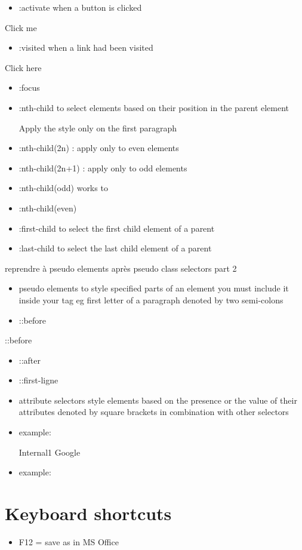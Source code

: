 \documentclass[
]{book}
\providecommand{\tightlist}{%
  \setlength{\itemsep}{0pt}\setlength{\parskip}{0pt}}
\begin{document}
\begin{itemize}
\tightlist
\item
  :activate
  when a button is clicked
\end{itemize}

Click me

\begin{itemize}
\tightlist
\item
  :visited
  when a link had been visited
\end{itemize}

Click here

\begin{itemize}
\tightlist
\item
  :focus
\end{itemize}

\begin{itemize}
\item
  :nth-child
  to select elements based on their position in the parent element

  Apply the style only on the first paragraph
\item
  :nth-child(2n) : apply only to even elements
\item
  :nth-child(2n+1) : apply only to odd elements
\item
  :nth-child(odd) works to
\item
  :nth-child(even)
\item
  :first-child
  to select the first child element of a parent
\item
  :last-child
  to select the last child element of a parent
\end{itemize}

reprendre à pseudo elements après pseudo class selectors part 2

\begin{itemize}
\item
  pseudo elements
  to style specified parts of an element
  you must include it inside your tag
  eg first letter of a paragraph
  denoted by two semi-colons
\item
  ::before
\end{itemize}

::before

\begin{itemize}
\item
  ::after
\item
  ::first-ligne
\item
  attribute selectors
  style elements based on the presence or the value of their attributes
  denoted by square brackets
  in combination with other selectors
\item
  example:

  Internal1
  Google
\item
  example:
\end{itemize}

\hypertarget{keyboard-shortcuts}{%
\chapter{Keyboard shortcuts}\label{keyboard-shortcuts}}

\begin{itemize}
\tightlist
\item
  F12 = save as in MS Office
\end{itemize}

  
\end{document}
